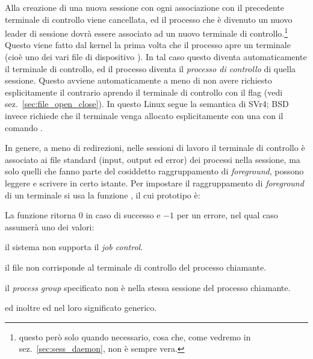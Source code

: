 Alla creazione di una nuova sessione con  ogni associazione con
il precedente terminale di controllo viene cancellata, ed il processo che è
divenuto un nuovo leader di sessione dovrà essere associato ad un nuovo
terminale di controllo.\footnote{questo però solo quando necessario, cosa che,
  come vedremo in sez.~\ref{sec:sess_daemon}, non è sempre vera.} Questo viene
fatto dal kernel la prima volta che il processo apre un terminale (cioè uno
dei vari file di dispositivo ). In tal caso questo diventa
automaticamente il terminale di controllo, ed il processo diventa il
\textsl{processo di controllo} di quella sessione. Questo avviene
automaticamente a meno di non avere richiesto esplicitamente il contrario
aprendo il terminale di controllo con il flag  (vedi
sez.~\ref{sec:file_open_close}). In questo Linux segue la semantica di SVr4;
BSD invece richiede che il terminale venga allocato esplicitamente con una
 con il comando .

In genere, a meno di redirezioni, nelle sessioni di lavoro il terminale di
controllo è associato ai file standard (input, output ed error) dei processi
nella sessione, ma solo quelli che fanno parte del cosiddetto raggruppamento
di \textit{foreground}, possono leggere e scrivere in certo istante. Per
impostare il raggruppamento di \textit{foreground} di un terminale si usa la
funzione , il cui prototipo è:

\begin{funcproto}{
}

{La funzione ritorna $0$ in caso di successo e $-1$ per un errore, nel qual
  caso  assumerà uno dei valori: 
  \begin{errlist}
    \item[\errcode{ENOSYS}] il sistema non supporta il \textit{job control}.
    \item[\errcode{ENOTTY}] il file  non corrisponde al terminale di
      controllo del processo chiamante.
    \item[\errcode{EPERM}] il \textit{process group} specificato non è nella
    stessa sessione del processo chiamante.
  \end{errlist}
  ed inoltre  ed  nel loro significato generico.}
\end{funcproto}

